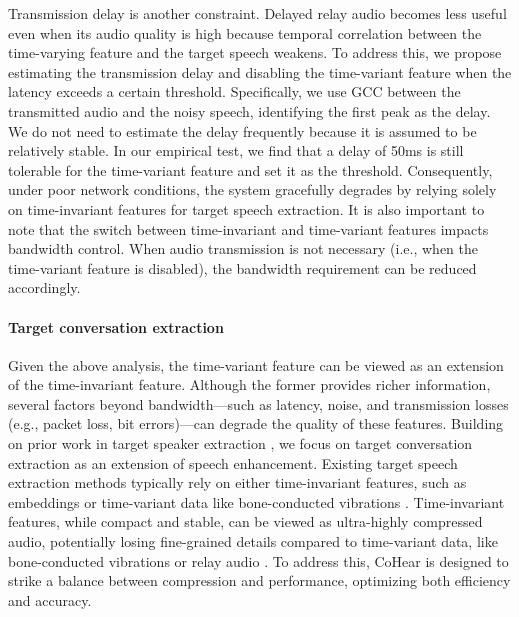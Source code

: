 Transmission delay is another constraint. Delayed relay audio becomes less useful even when its audio quality is high because temporal correlation between the time-varying feature and the target speech weakens.
To address this, we propose estimating the transmission delay and disabling the time-variant feature when the latency exceeds a certain threshold. 
Specifically, we use GCC between the transmitted audio and the noisy speech, identifying the first peak as the delay.
We do not need to estimate the delay frequently because it is assumed to be relatively stable.
In our empirical test, we find that a delay of 50ms is still tolerable for the time-variant feature and set it as the threshold.
Consequently, under poor network conditions, the system gracefully degrades by relying solely on time-invariant features for target speech extraction.
It is also important to note that the switch between time-invariant and time-variant features impacts bandwidth control. When audio transmission is not necessary (i.e., when the time-variant feature is disabled), the bandwidth requirement can be reduced accordingly.


\paragraph{Target conversation extraction}
Given the above analysis, the time-variant feature can be viewed as an extension of the time-invariant feature. Although the former provides richer information, several factors beyond bandwidth—such as latency, noise, and transmission losses (e.g., packet loss, bit errors)—can degrade the quality of these features.
Building on prior work in target speaker extraction \cite{veluri2024look}, we focus on target conversation extraction as an extension of speech enhancement. Existing target speech extraction methods typically rely on either time-invariant features, such as embeddings \cite{chen2024target, veluri2024look} or time-variant data like bone-conducted vibrations \cite{he2023towards}.
Time-invariant features, while compact and stable, can be viewed as ultra-highly compressed audio, potentially losing fine-grained details compared to time-variant data, like bone-conducted vibrations \cite{he2023towards} or relay audio \cite{shen2018mute}. To address this, CoHear is designed to strike a balance between compression and performance, optimizing both efficiency and accuracy.

